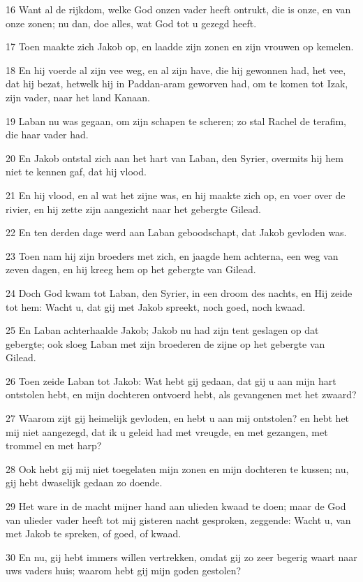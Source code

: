 \par 16 Want al de rijkdom, welke God onzen vader heeft ontrukt, die is onze, en van onze zonen; nu dan, doe alles, wat God tot u gezegd heeft.
\par 17 Toen maakte zich Jakob op, en laadde zijn zonen en zijn vrouwen op kemelen.
\par 18 En hij voerde al zijn vee weg, en al zijn have, die hij gewonnen had, het vee, dat hij bezat, hetwelk hij in Paddan-aram geworven had, om te komen tot Izak, zijn vader, naar het land Kanaan.
\par 19 Laban nu was gegaan, om zijn schapen te scheren; zo stal Rachel de terafim, die haar vader had.
\par 20 En Jakob ontstal zich aan het hart van Laban, den Syrier, overmits hij hem niet te kennen gaf, dat hij vlood.
\par 21 En hij vlood, en al wat het zijne was, en hij maakte zich op, en voer over de rivier, en hij zette zijn aangezicht naar het gebergte Gilead.
\par 22 En ten derden dage werd aan Laban geboodschapt, dat Jakob gevloden was.
\par 23 Toen nam hij zijn broeders met zich, en jaagde hem achterna, een weg van zeven dagen, en hij kreeg hem op het gebergte van Gilead.
\par 24 Doch God kwam tot Laban, den Syrier, in een droom des nachts, en Hij zeide tot hem: Wacht u, dat gij met Jakob spreekt, noch goed, noch kwaad.
\par 25 En Laban achterhaalde Jakob; Jakob nu had zijn tent geslagen op dat gebergte; ook sloeg Laban met zijn broederen de zijne op het gebergte van Gilead.
\par 26 Toen zeide Laban tot Jakob: Wat hebt gij gedaan, dat gij u aan mijn hart ontstolen hebt, en mijn dochteren ontvoerd hebt, als gevangenen met het zwaard?
\par 27 Waarom zijt gij heimelijk gevloden, en hebt u aan mij ontstolen? en hebt het mij niet aangezegd, dat ik u geleid had met vreugde, en met gezangen, met trommel en met harp?
\par 28 Ook hebt gij mij niet toegelaten mijn zonen en mijn dochteren te kussen; nu, gij hebt dwaselijk gedaan zo doende.
\par 29 Het ware in de macht mijner hand aan ulieden kwaad te doen; maar de God van ulieder vader heeft tot mij gisteren nacht gesproken, zeggende: Wacht u, van met Jakob te spreken, of goed, of kwaad.
\par 30 En nu, gij hebt immers willen vertrekken, omdat gij zo zeer begerig waart naar uws vaders huis; waarom hebt gij mijn goden gestolen?
